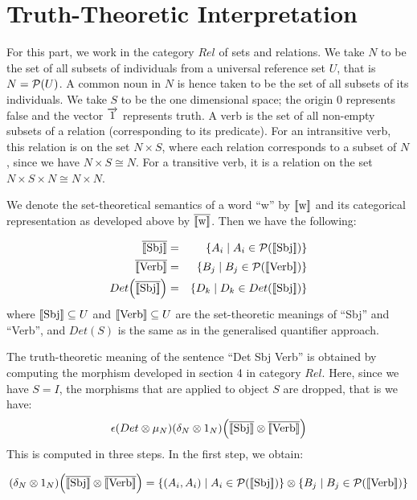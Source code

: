 \documentclass[a4paper,11pt]{easychair}
\begin{document}
\section{Truth-Theoretic Interpretation}
For this part, we work in the category $Rel$ of sets and relations. We take $N$ to be the set of all subsets of individuals from a universal reference set $U$, that is $N = {\cal P}(U)$.  A common noun in $N$  is hence taken to be  the set of all subsets of its individuals.  We take $S$ to be the one dimensional space; the origin $0$ represents false and the vector $\overrightarrow{1}$ represents truth.  A verb is the set of all non-empty subsets of a relation (corresponding to its predicate). 
For an intransitive verb, this relation is on the set $N \times S$, where each relation corresponds to a subset of $N$, since we have  $N \times S \cong N$. For a transitive verb, it is a relation on the set $N \times S \times N \cong 
N \times N$.

We denote the set-theoretical  semantics of a word ``w'' by $[\![ \text w ]\!]$ and its categorical representation as developed above  by $\overline{[\![ \text w ]\!]}$. Then  we have the following:

\begin{eqnarray*}
\overline{\semantics{\text{Sbj}}} &=& \{A_i \mid A_i \in {\cal P}(\semantics{\text{Sbj}})\}\\
\overline{\semantics{\text{Verb}}} &=& \{B_j \mid B_j \in {\cal P}(\semantics{\text{Verb}})\}\\
Det\Big(\overline{\semantics{\text{Sbj}}}\Big) &=& \{D_k \mid D_k \in Det(\semantics{\text{Sbj}})\}
\end{eqnarray*}
where   $[\![ \text{Sbj} ]\!] \subseteq U$ and $[\![ \text{Verb} ]\!] \subseteq U$ are the set-theoretic meanings of ``Sbj'' and ``Verb'', and $Det(S)$  is the same as in the generalised quantifier approach. 

The truth-theoretic meaning of the sentence ``Det Sbj Verb''  is obtained  by computing   the   morphism  developed in section 4 in category $Rel$. Here, since we  have $S = I$,  the morphisms that are applied to object $S$ are dropped, that is we have:
\[
\epsilon(Det \otimes  \mu_N)(\delta_N \otimes 1_{N})
\Big(\overline{[\![ \text{Sbj} ]\!]} \otimes \overline{[\![ \text{Verb} ]\!]}
\Big)
\] 
This  is computed in three steps. In the  first step, we obtain:

\begin{align*}
(\delta_N \otimes 1_{N})\Big(\overline{\semantics{\text{Sbj}}} \otimes \overline{\semantics{\text{Verb}}}\Big) =  \{(A_i, A_i) \mid A_i \in {\cal P} (\semantics{\text{Sbj}})\} \otimes \{B_j \mid B_j \in  {\cal P} (\semantics{\text{Verb}})\}
\end{align*}
\end{document}
